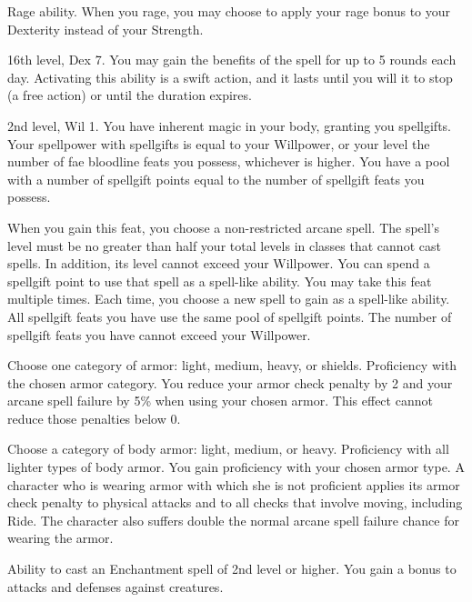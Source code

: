 \featpre Rage ability.
\featben When you rage, you may choose to apply your rage bonus to your Dexterity instead of your Strength.

\featpres 16th level, Dex 7.
\featben You may gain the benefits of the 
spell for up to 5 rounds each day.
Activating this ability is a swift action, and it lasts until you will it to stop (a free action) or until the duration expires.

\featpres 2nd level, Wil 1.
\featben You have inherent magic in your body, granting you spellgifts.
Your spellpower with spellgifts is equal to your Willpower, or your level \add the number of fae bloodline feats you possess, whichever is higher.
You have a pool with a number of spellgift points equal to the number of spellgift feats you possess.

When you gain this feat, you choose a non-restricted arcane spell.
The spell's level must be no greater than half your total levels in classes that cannot cast spells.
In addition, its level cannot exceed your Willpower.
You can spend a spellgift point to use that spell as a spell-like ability.
You may take this feat multiple times.
Each time, you choose a new spell to gain as a spell-like ability.
All spellgift feats you have use the same pool of spellgift points.
The number of spellgift feats you have cannot exceed your Willpower.

Choose one category of armor: light, medium, heavy, or shields.
\featpre Proficiency with the chosen armor category.
\featben You reduce your armor check penalty by 2 and your arcane spell failure by 5\% when using your chosen armor.
This effect cannot reduce those penalties below 0.

Choose a category of body armor: light, medium, or heavy.
\featpre Proficiency with all lighter types of body armor.
\featben You gain proficiency with your chosen armor type.
A character who is wearing armor with which she is not proficient applies its armor check penalty to physical attacks and to all checks that involve moving, including Ride.
The character also suffers double the normal arcane spell failure chance for wearing the armor.

\featpre Ability to cast an Enchantment spell of 2nd level or higher.
\featben You gain a  bonus to attacks and defenses against \bewildered creatures.
\featspecial \featbanenotes


